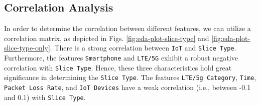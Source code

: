\documentclass[conference]{IEEEtran}
\begin{document}
\subsection{Correlation Analysis}
In order to determine the correlation between different features, we can utilize a correlation matrix, as depicted in Figs. \ref{fig:eda-plot-slice-type} and \ref{fig:eda-plot-slice-type-only}. There is a strong correlation between \texttt{\footnotesize IoT} and \texttt{\footnotesize Slice Type}. Furthermore, the features \texttt{\footnotesize Smartphone} and \texttt{\footnotesize LTE/5G} exhibit a robust negative correlation with \texttt{\footnotesize Slice Type}. Hence, these three characteristics hold great significance in determining the \texttt{\footnotesize Slice Type}. The features \texttt{\footnotesize LTE/5g Category}, \texttt{\footnotesize Time}, \texttt{\footnotesize Packet Loss Rate}, and \texttt{\footnotesize IoT Devices} have a weak correlation (i.e., between -0.1 and 0.1) with \texttt{\footnotesize Slice Type}. 
\end{document}
